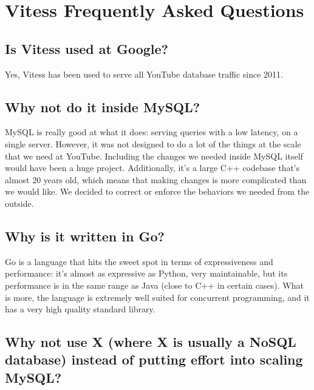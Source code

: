 
\section{Vitess Frequently Asked Questions}\hypertarget{vitess-frequently-asked-questions}{}\label{vitess-frequently-asked-questions}

\subsection{Is Vitess used at Google?}\hypertarget{is-vitess-used-at-google}{}\label{is-vitess-used-at-google}

Yes, Vitess has been used to serve all YouTube database traffic since
2011.

\subsection{Why not do it inside MySQL?}\hypertarget{why-not-do-it-inside-mysql}{}\label{why-not-do-it-inside-mysql}

MySQL is really good at what it does: serving queries with a low
latency, on a single server. However, it was not designed to do a lot
of the things at the scale that we need at YouTube. Including the
changes we needed inside MySQL itself would have been a huge
project. Additionally, it’s a large C++ codebase that’s almost 20
years old, which means that making changes is more complicated than we
would like. We decided to correct or enforce the behaviors we
needed from the outside.

\subsection{Why is it written in Go?}\hypertarget{why-is-it-written-in-go}{}\label{why-is-it-written-in-go}

Go is a language that hits the sweet spot in terms of expressiveness
and performance: it’s almost as expressive as Python, very
maintainable, but its performance is in the same range as Java (close
to C++ in certain cases). What is more, the language is extremely well
suited for concurrent programming, and it has a very high quality
standard library.

\subsection{Why not use X (where X is usually a NoSQL database) instead of putting effort into scaling MySQL?}\hypertarget{why-not-use-x-where-x-is-usually-a-nosql-database-instead-of-putting-effort-into-scaling-mysql}{}\label{why-not-use-x-where-x-is-usually-a-nosql-database-instead-of-putting-effort-into-scaling-mysql}

